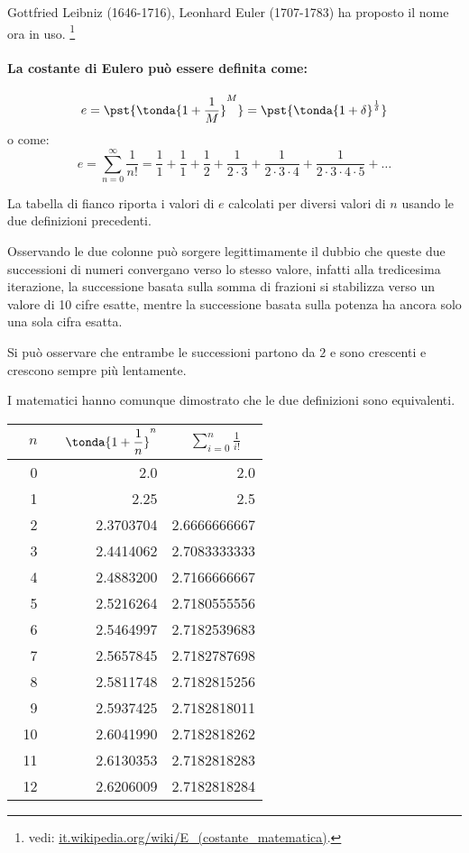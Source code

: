 \noindent Gottfried Leibniz (1646-1716), Leonhard Euler (1707-1783) ha 
proposto il nome ora in uso.
\footnote{vedi: 
\href{https://it.wikipedia.org/wiki/E\_(costante\_matematica)}
     {it.wikipedia.org/wiki/E\_(costante\_matematica)}. 
}

\paragraph{La costante di Eulero può essere definita come:}
\[e = \pst{\tonda{1+\frac{1}{M}}^M} = 
\pst{\tonda{1+\delta}^\frac{1}{\delta}} 
\]
o come:
\[e=\sum_{n=0}^{\infty}{\frac{1}{n!}}=
\frac{1}{1}+\frac{1}{1}+\frac{1}{2}+\frac{1}{2\cdot3}+
\frac{1}{2\cdot3\cdot4}+\frac{1}{2\cdot3\cdot4\cdot5}+\dots\]

\begin{minipage}{.49\textwidth}
La tabella di fianco riporta i valori di \(e\) calcolati per diversi valori 
di \(n\) usando le due definizioni precedenti.

Osservando le due colonne può sorgere legittimamente il dubbio che queste 
due successioni di numeri convergano verso lo stesso valore, 
infatti alla tredicesima iterazione, la successione 
basata sulla somma di frazioni si stabilizza verso un valore di 10 cifre 
esatte, 
mentre la successione basata sulla potenza ha ancora solo una sola cifra 
esatta.

Si può osservare che entrambe le successioni partono da \(2\) e sono 
crescenti e crescono sempre più lentamente.

I matematici hanno comunque dimostrato che le due definizioni sono 
equivalenti.

\end{minipage}
\hfill
\begin{minipage}{.49\textwidth}
\begin{center}
\begin{tabular}{rrr}
\(\quad n\) &
\(\quad \tonda{1+\dfrac{1}{n}}^n\) &
\(\quad \displaystyle \sum_{i=0}^{n}{\frac{1}{i!}} \quad\)\\
\hline
0 &        2.0 &           2.0 \\
1 &       2.25 &           2.5 \\
2 &  2.3703704 &  2.6666666667 \\
3 &  2.4414062 &  2.7083333333 \\
4 &  2.4883200 &  2.7166666667 \\
5 &  2.5216264 &  2.7180555556 \\
6 &  2.5464997 &  2.7182539683 \\
7 &  2.5657845 &  2.7182787698 \\
8 &  2.5811748 &  2.7182815256 \\
9 &  2.5937425 &  2.7182818011 \\
10 & 2.6041990 &  2.7182818262 \\
11 & 2.6130353 &  2.7182818283 \\
12 & 2.6206009 &  2.7182818284\\
\end{tabular}
\end{center}
\end{minipage}
\vspace{1em}

